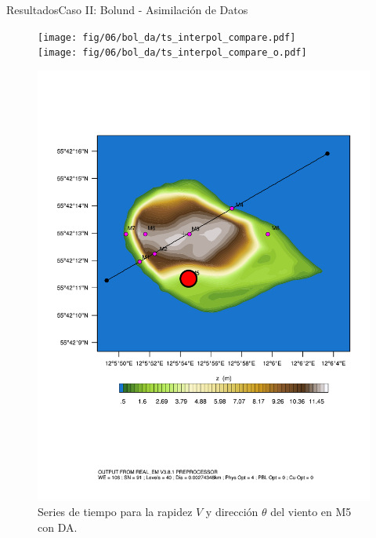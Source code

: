\documentclass[mathserif,10pt]{beamer}
\begin{document}
\begin{frame}{Resultados}{Caso II: Bolund - Asimilación de Datos}
	\begin{figure}[H]
		\begin{minipage}{0.65\linewidth}
			\texttt{[image: fig/06/bol\_da/ts\_interpol\_compare.pdf]}\\%
			\texttt{[image: fig/06/bol\_da/ts\_interpol\_compare\_o.pdf]}%
		\end{minipage}%
		\begin{minipage}{0.35\linewidth}
			\centering
			\includegraphics[width=1\linewidth,page=1,trim={3.5cm 9.3cm 0.8cm 3.8cm},clip]{fig/05/ppt/bol_control_point5.pdf}%
		\end{minipage}%
		\vspace{-2mm}\caption{Series de tiempo para la rapidez $V$ y dirección $\theta$ del viento en M5 con DA.}
		\label{fig:06_bol_da_ts_m5}
	\end{figure}
\end{frame}
\end{document}
